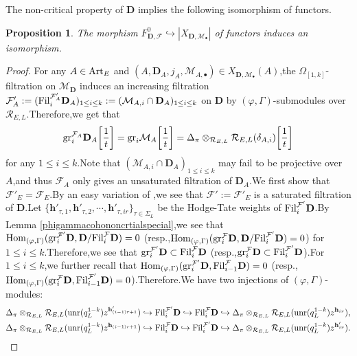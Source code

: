 \documentclass[SecEq,CM,GP]{degruyter-crelle} %
\theoremstyle{plain}
\newtheorem{pro}[thm]{Proposition}
\newcommand{\Art}{{\rm Art}}
\newcommand{\Dpik}{{\mathbf{D}}}
\newcommand{\fil}{{\rm Fil}}
\newcommand{\gr}{{\rm gr}}
\newcommand{\homo}{{\rm Hom}}
\newcommand{\hpi}{{{\mathbf{h}}}}
\newcommand{\omepik}{\Omega_{[1,k]}}
\newcommand{\unr}{{\rm unr}}
\newcommand{\cR}{\mathcal R}
\newcommand{\cM}{\mathcal M}
\newcommand{\cF}{\mathcal F}
\begin{document}
The non-critical property of $\Dpik$ implies the following isomorphism of functors.\;

\begin{pro}\label{isotwofunctor}The morphism $F_{\Dpik,\cF}^0\hookrightarrow |X_{\Dpik,\cM_{\bullet}}|$ of functors induces an isomorphism.\;
\end{pro}
\begin{proof}For any $A\in \Art_E$  and $(A,\Dpik_A,j_A,\cM_{A,\bullet})\in X_{\Dpik,\cM_{\bullet}}(A)$,\;the $\omepik$-filtration on $\cM_\Dpik$ induces an increasing filtration $\cF'_{A}:=(\fil_{i}^{\cF'_{A}}\Dpik_A)_{1\leq i\leq k}:=(\cM_{A,i}\cap \Dpik_A)_{1\leq i\leq k}$ on $\Dpik$ by $(\varphi,\Gamma)$-submodules  over $\cR_{E,L}$.\;Therefore,\;we get that 
\[\gr_{i}^{\cF_{A}}\Dpik_A\bigg[\frac{1}{t}\bigg]=\gr_{i}\cM_A\bigg[\frac{1}{t}\bigg]=\Delta_\pi\otimes_{\cR_{E,L}}\cR_{E,L}(\delta_{A,i})\bigg[\frac{1}{t}\bigg]\]
for any $1\leq i\leq k$.\;Note that $(\cM_{A,i}\cap \Dpik_A)_{1\leq i\leq k}$ may fail to be projective over $A$,\;and thus $\cF_{A}$ only gives an unsaturated filtration of $\Dpik_A$.\;We first show that $\cF'_{E}=\cF_{E}$.\;By an easy variation of \cite[Lemma 2.4.2]{AST2009324R10},\;we see that $\cF':=\cF'_{E}$ is a saturated filtration of $\Dpik$.\;Let $\{\hpi'_{\tau,1},\hpi'_{\tau,2},\cdots,\hpi'_{\tau,ir}\}_{\tau\in \Sigma_L}$ be the Hodge-Tate weights of $\fil_i^{\cF'}\Dpik$.\;By Lemma \ref{phigammacohononcrtialspecial},\;we see that $\homo_{(\varphi,\Gamma)}(\gr_{i}^{\cF'}\Dpik,\Dpik/\fil_{i}^{\cF}\Dpik)=0$ (resp.,\;$\homo_{(\varphi,\Gamma)}(\gr_{i}^{\cF}\Dpik,\Dpik/\fil_{i}^{\cF'}\Dpik)=0$) for $1\leq i\leq k$.\;Therefore,\;we see that $\gr_{i}^{\cF'}\Dpik\subset \fil_{i}^{\cF}\Dpik$ (resp.,\;$\gr_{i}^{\cF}\Dpik\subset \fil_{i}^{\cF'}\Dpik$).\;For $1\leq i\leq k$,\;we further recall that $\homo_{(\varphi,\Gamma)}(\gr_{i}^{\cF'}\Dpik,\fil_{i-1}^{\cF}\Dpik)=0$ (resp.,\;$\homo_{(\varphi,\Gamma)}(\gr_{i}^{\cF}\Dpik,\fil_{i-1}^{\cF'}\Dpik)=0$).\;Therefore.\;We have two injections of $(\varphi,\Gamma)$-modules:
\begin{equation}
	\begin{aligned}
		&\Delta_\pi\otimes_{\cR_{E,L}}\cR_{E,L}(\unr(q_L^{1-k}){z^{\hpi'_{(i-1)r+1}}})\hookrightarrow \fil_i^{\cF'}\Dpik\hookrightarrow \fil_i^{\cF}\Dpik \hookrightarrow \Delta_\pi\otimes_{\cR_{E,L}}\cR_{E,L}(\unr(q_L^{1-k}){z^{\hpi_{ir}}}),\\
		&\Delta_\pi\otimes_{\cR_{E,L}}\cR_{E,L}(\unr(q_L^{1-k}){z^{\hpi_{(i-1)r+1}}})\hookrightarrow \fil_i^{\cF}\Dpik\hookrightarrow \fil_i^{\cF'}\Dpik \hookrightarrow \Delta_\pi\otimes_{\cR_{E,L}}\cR_{E,L}(\unr(q_L^{1-k}){z^{\hpi'_{ir}}}).

\end{aligned}
\end{equation}
\end{proof}
\end{document}
